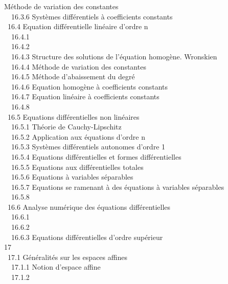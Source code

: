 \documentclass[]{article}
\begin{document}
{Méthode de variation des
constantes} \\ ~~16.3.6
{Systèmes différentiels à
coefficients constants} \\ ~16.4
{Equation différentielle linéaire
d'ordre n} \\ ~~16.4.1
 \\ ~~16.4.2
 \\
~~16.4.3 {Structure des
solutions de l'équation homogène. Wronskien} \\ ~~16.4.4
{Méthode de variation des
constantes} \\ ~~16.4.5 {Méthode
d'abaissement du degré} \\ ~~16.4.6
{Equation homogène à
coefficients constants} \\ ~~16.4.7
{Equation linéaire à
coefficients constants} \\ ~~16.4.8
 \\ ~16.5
{Equations différentielles non
linéaires} \\ ~~16.5.1 {Théorie
de Cauchy-Lipschitz} \\ ~~16.5.2
{Application aux équations
d'ordre n} \\ ~~16.5.3 {Systèmes
différentiels autonomes d'ordre 1} \\ ~~16.5.4
{Equations différentielles et
formes différentielles} \\ ~~16.5.5
{Equations aux différentielles
totales} \\ ~~16.5.6 {Equations
à variables séparables} \\ ~~16.5.7
{Equations se ramenant à des
équations à variables séparables} \\ ~~16.5.8
 \\ ~16.6
{Analyse numérique des équations
différentielles} \\ ~~16.6.1
 \\ ~~16.6.2
 \\
~~16.6.3 {Equations
différentielles d'ordre supérieur} \\ 17
 \\ ~17.1
{Généralités sur les espaces
affines} \\ ~~17.1.1 {Notion
d'espace affine} \\ ~~17.1.2
\end{document}
